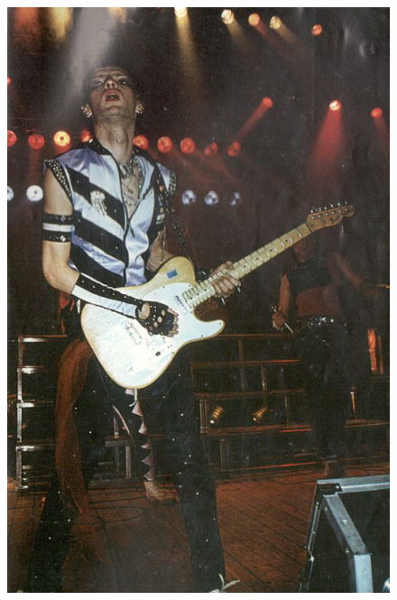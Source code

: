 \documentclass[16pt,a5paper,oneside]{book}
\begin{document}
\begin{figure}
    \centering
    \includegraphics[scale=0.6]{Cover3}
\end{figure}
\end{document}

